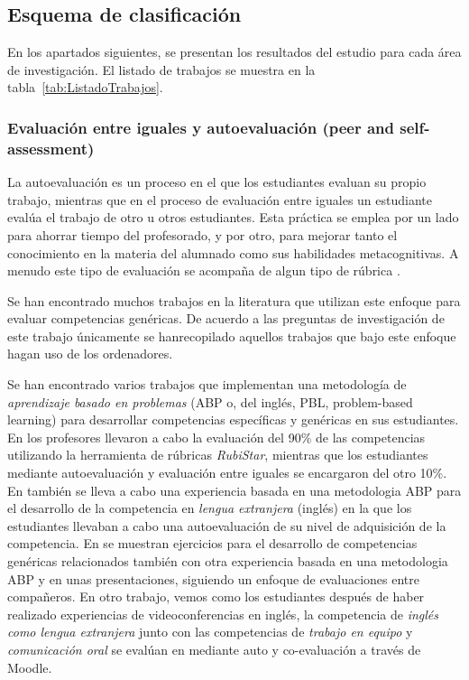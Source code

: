 \subsection{Esquema de clasificación}

En los apartados siguientes, se presentan los resultados del estudio para cada área de investigación. El listado de trabajos se muestra en la tabla~\ref{tab:ListadoTrabajos}.

\subsubsection{Evaluación entre iguales y autoevaluación (peer and self-assessment)}

La autoevaluación es un proceso en el que los estudiantes evaluan su propio trabajo, mientras que  en el proceso de evaluación entre iguales un estudiante evalúa el trabajo de otro u otros estudiantes. Esta práctica se emplea por un lado para ahorrar tiempo del profesorado, y por otro, para mejorar tanto el conocimiento en la materia del alumnado como sus habilidades metacognitivas. A menudo este tipo de evaluación se acompaña de algun tipo de rúbrica \cite{malehorn1994ten}.

Se han encontrado muchos trabajos en la literatura que utilizan este enfoque para evaluar competencias genéricas. De acuerdo a las preguntas de investigación de este trabajo únicamente se hanrecopilado aquellos trabajos que bajo este enfoque hagan uso de los ordenadores.

Se han encontrado varios trabajos que implementan una metodología de \emph{aprendizaje basado en problemas} (ABP o, del inglés, PBL, problem-based learning) para desarrollar competencias específicas y genéricas en sus estudiantes. En \cite{lasa2013problem} los profesores llevaron a cabo la evaluación del 90\% de las competencias utilizando la herramienta de rúbricas \emph{RubiStar}, mientras que los estudiantes mediante autoevaluación y evaluación entre iguales se encargaron del otro 10\%. En \cite{renau2010teaching} también se lleva a cabo una experiencia basada en una metodologia ABP para el desarrollo de la competencia en \emph{lengua extranjera} (inglés) en la que los estudiantes llevaban a cabo una autoevaluación de su nivel de adquisición de la competencia. En \cite{johnson2002encouraging} se muestran ejercicios para el desarrollo de competencias genéricas relacionados también con otra experiencia basada en una metodologia ABP y en unas presentaciones, siguiendo un enfoque de evaluaciones entre compañeros. En otro trabajo, vemos como los estudiantes después de haber realizado experiencias de videoconferencias en inglés, la competencia de \emph{inglés como lengua extranjera} junto con las competencias de \emph{trabajo en equipo} y \emph{comunicación oral} se evalúan en \cite{masip2013self} mediante auto y co-evaluación a través de Moodle.

